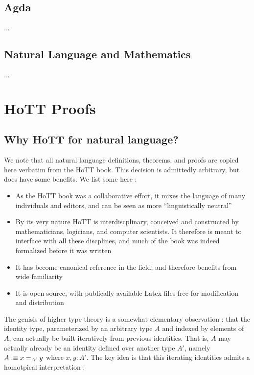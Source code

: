 \documentclass[11pt, a4paper]{article}
\newcommand{\defeq}{\vcentcolon\equiv}  %
\begin{document}
\subsection{Agda}

...

\subsection{Natural Language and Mathematics}

...

\section{HoTT Proofs}

\subsection{Why HoTT for natural language?}

We note that all natural language definitions, theorems, and proofs are copied
here verbatim from the HoTT book.  This decision is admittedly arbitrary, but
does have some benefits.  We list some here : 

\begin{itemize}[noitemsep]

\item As the HoTT book was a collaborative effort, it mixes the language of
many individuals and editors, and can be seen as more ``linguistically
neutral''

\item By its very nature HoTT is interdiscplinary, conceived and constructed by
mathematicians, logicians, and computer scientists. It therefore is meant to
interface with all these discplines, and much of the book was indeed formalized
before it was written

\item It has become canonical reference in the field, and therefore benefits
from wide familiarity

\item It is open source, with publically available Latex files free for
modification and distribution

\end{itemize}

The genisis of higher type theory is a somewhat elementary observation : that
the identity type, parameterized by an arbitrary type $A$ and indexed by
elements of $A$, can actually be built iteratively from previous identities.
That is, $A$ may actually already be an identity defined over another type
$A'$, namely $A \defeq x=_{A'} y$ where $x,y:A'$. The key idea is that this
iterating identities admits a homotpical interpretation : 
\end{document}
